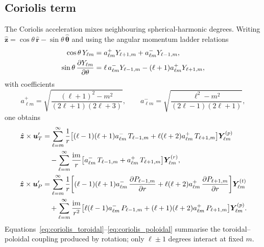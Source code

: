 \documentclass[11pt]{article}
\numberwithin{equation}{section}
\begin{document}
\subsection{Coriolis term}
The Coriolis acceleration mixes neighbouring spherical-harmonic degrees. Writing $\hat{\bm{z}} = \cos\theta\, \hat{\bm{r}} - \sin\theta\, \hat{\bm{\theta}}$ and using the angular momentum ladder relations
\begin{align}
  \cos\theta\, Y_{\ell m} &= a_{\ell m}^{+} Y_{\ell+1, m} + a_{\ell m}^{-} Y_{\ell-1, m},
  \label{eq:cos_relation} \\
  \sin\theta\, \pdv{Y_{\ell m}}{\theta} &= \ell\, a_{\ell m}^{-} Y_{\ell-1, m}
                                        - (\ell+1) a_{\ell m}^{+} Y_{\ell+1, m},
  \label{eq:theta_relation}
\end{align}
with coefficients
\begin{equation}
  a_{\ell m}^{+} = \sqrt{\frac{(\ell+1)^2 - m^2}{(2\ell+1)(2\ell+3)}}, \qquad
  a_{\ell m}^{-} = \sqrt{\frac{\ell^2 - m^2}{(2\ell-1)(2\ell+1)}},
  \label{eq:a_coeffs}
\end{equation}
one obtains
\begin{align}
  \hat{\bm{z}} \times \bm{u}_T'
  &= \sum_{\ell=m}^{\infty} \frac{1}{r}
     \qty[ (\ell-1)(\ell+1) a_{\ell m}^{-}\, T_{\ell-1,m}
           + \ell(\ell+2) a_{\ell m}^{+}\, T_{\ell+1,m} ] \bm{Y}_{\ell m}^{(p)}
    \nonumber \\
  &\quad
     - \sum_{\ell=m}^{\infty} \frac{\mathrm{i} m}{r}
       \qty[ a_{\ell m}^{-}\, T_{\ell-1,m} + a_{\ell m}^{+}\, T_{\ell+1,m} ]
       \bm{Y}_{\ell m}^{(r)},
  \label{eq:coriolis_toroidal}
  \\
  \hat{\bm{z}} \times \bm{u}_P'
  &= \sum_{\ell=m}^{\infty} \frac{1}{r}
     \qty[ (\ell-1)(\ell+1) a_{\ell m}^{-}\, \pdv{P_{\ell-1,m}}{r}
           + \ell(\ell+2) a_{\ell m}^{+}\, \pdv{P_{\ell+1,m}}{r} ] \bm{Y}_{\ell m}^{(t)}
    \nonumber \\
  &\quad
     + \sum_{\ell=m}^{\infty} \frac{\mathrm{i} m}{r^2}
       \qty[ \ell(\ell-1) a_{\ell m}^{-}\, P_{\ell-1,m}
             + (\ell+1)(\ell+2) a_{\ell m}^{+}\, P_{\ell+1,m} ]
       \bm{Y}_{\ell m}^{(p)}.
  \label{eq:coriolis_poloidal}
\end{align}
Equations~\eqref{eq:coriolis_toroidal}--\eqref{eq:coriolis_poloidal} summarise the toroidal--poloidal coupling produced by rotation; only $\ell \pm 1$ degrees interact at fixed $m$.
\end{document}
